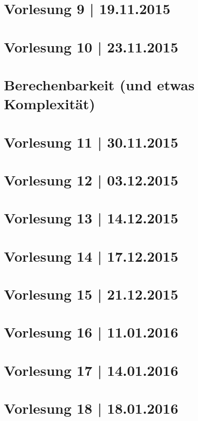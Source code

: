\newpage
\part*{Vorlesung 9 | 19.11.2015}

\newpage
\part*{Vorlesung 10 | 23.11.2015}


\newpage
\part[Berechenbarkeit]{Berechenbarkeit {\large (und etwas Komplexität)}}

\part*{Vorlesung 11 | 30.11.2015}

\newpage
\part*{Vorlesung 12 | 03.12.2015}


\newpage
\part*{Vorlesung 13 | 14.12.2015}

\newpage
\part*{Vorlesung 14 | 17.12.2015}

\newpage
\part*{Vorlesung 15 | 21.12.2015}


\newpage
\part*{Vorlesung 16 | 11.01.2016}


\newpage
\part*{Vorlesung 17 | 14.01.2016}


\newpage
\part*{Vorlesung 18 | 18.01.2016}

